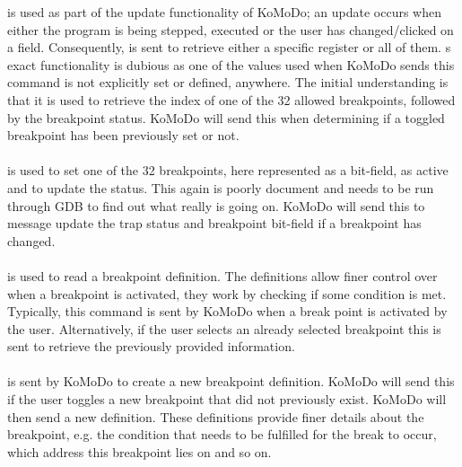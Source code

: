 %
 is used as part of the update functionality of KoMoDo; an update occurs when either the program is being stepped, executed or the user has changed/clicked on a field. Consequently,  is sent to retrieve either a specific register or all of them.
%
%
%
%
s exact functionality is dubious as one of the values used when KoMoDo sends this command is not explicitly set or defined, anywhere. The initial understanding is that it is used to retrieve the index of one of the 32 allowed breakpoints, followed by the breakpoint status. KoMoDo will send this when determining if a toggled breakpoint has been previously set or not.\\\\
%
 is used to set one of the 32 breakpoints, here represented as a bit-field, as active and to update the status. This again is poorly document and needs to be run through GDB to find out what really is going on. KoMoDo will send this to message update the trap status and breakpoint bit-field if a breakpoint has changed.\\\\
%
 is used to read a breakpoint definition. The definitions allow finer control over when a breakpoint is activated, they work by checking if some condition is met. Typically, this command is sent by KoMoDo when a break point is activated by the user. Alternatively, if the user selects an already selected breakpoint this is sent to retrieve the previously provided information.\\\\
%
 is sent by KoMoDo to create a new breakpoint definition. KoMoDo will send this if the user toggles a new breakpoint that did not previously exist. KoMoDo will then send a new definition. These definitions  provide finer details about the breakpoint, e.g. the condition that needs to be fulfilled for the break to occur, which address this breakpoint lies on and so on.
